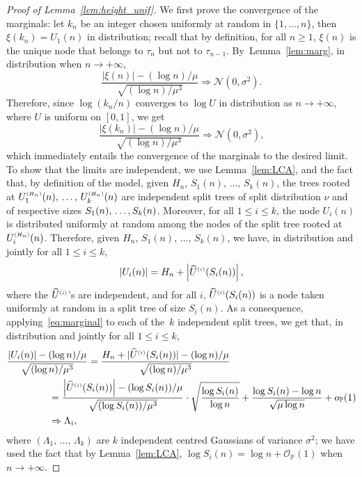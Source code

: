 \documentclass[10pt]{amsart}
\theoremstyle{definition}\newtheorem{defi}[theo]{Definition}\newtheorem{rema}[theo]{Remark}\newtheorem{exam}[theo]{Example}\newtheorem{exem}[theo]{Example}\newtheorem{nota}[theo]{Notation}
\newcommand{\sss}{\ensuremath{\scriptscriptstyle}}
\newcommand{\op}{{o_{\bbP}}}
\newcommand{\Op}{{\mathcal O_{\bbP}}}
\newcommand{\bbP}{\mathbb{P}}
\newcommand{\clN}{\mathcal{N}}
\begin{document}
\begin{proof}[Proof of Lemma~\ref{lem:height_unif}]
We first prove the convergence of the marginals: let $k_n$ be an integer chosen uniformly at random in $\{1, \ldots, n\}$, then $\xi(k_n) = U_1(n)$ in distribution; recall that by definition, for all $n\geq 1$, $\xi(n)$ is the unique node that belongs to $\tau_n$ but not to $\tau_{n-1}$. By~Lemma~\ref{lem:marg}, in distribution when $n\to+\infty$,
\[
\frac{|\xi(n)|-(\log n)/\mu}{\sqrt{(\log n)/\mu^3}}\Rightarrow\clN(0,\sigma^2).
\]
Therefore, since $\log (k_n/n)$ converges to $\log U$ in distribution as $n\to+\infty$, where $U$ is uniform on $[0,1]$, we get
\begin{equation}\label{eq:marginal}
\frac{|\xi(k_n)|-(\log n)/\mu}{\sqrt{(\log n)/\mu^3}}\Rightarrow\clN(0,\sigma^2),
\end{equation}
which immediately entails the convergence of the marginals to the desired limit. To show that the limits are independent, we use Lemma~\ref{lem:LCA}, and the fact that, by definition of the model, given $H_n$, $S_1(n), \,\ldots,\,S_k(n)$, the trees rooted at $U_1^{\sss (H_n)}(n),\,\ldots,\,U_k^{\sss (H_n)}\linebreak(n)$ are independent split trees of split distribution $\nu$ and of respective sizes $S_1(n), \,\ldots,\linebreak S_k(n)$. Moreover, for all $1\leq i\leq k$, the node $U_i(n)$ is distributed uniformly at random among the nodes of the split tree rooted at $U_i^{\sss (H_n)}(n)$. Therefore, given $H_n$, $S_1(n), \,\ldots,\,S_k(n)$, we have, in distribution and jointly for all $1\leq i\leq k$,
\[
|U_i(n)| = H_n + \left|\widehat U^{\sss (i)}(S_i(n))\right|,
\]
where the $\widehat U^{\sss (i)}$'s are independent, and for all $i$, $\widehat U^{\sss (i)}(S_i(n))$ is a node taken uniformly at random in a split tree of size $S_i(n)$. As a consequence, applying~\eqref{eq:marginal} to each of the~$k$ independent split trees, we get that, in distribution and jointly for all $1\leq i\leq k$,
\begin{align*}
\frac{|U_i(n)|-(\log n)/\mu}{\sqrt{(\log n)/\mu^3}} &= \frac{H_n + |\widehat U^{\sss (i)}(S_i(n))|-(\log n)/\mu}{\sqrt{(\log n)/\mu^3}}\\
&\hskip-4em= \frac{\left|\widehat U^{\sss (i)}(S_i(n))\right|-(\log S_i(n))/\mu}{\sqrt{(\log S_i(n))/\mu^3}}
\cdot \sqrt{\frac{\log S_i(n)}{\log n}} + \frac{\log S_i(n)-\log n}{\sqrt{\mu\log n}} +\op(1)\\
&\hskip-4em\Rightarrow \Lambda_i,
\end{align*}
where $(\Lambda_1,\,\ldots,\, \Lambda_k)$ are $k$ independent centred Gaussians of variance $\sigma^2$; we have used the fact that by Lemma~\ref{lem:LCA}, $\log S_i(n) = \log n + \Op(1)$ when $n\to+\infty$.
\end{proof}
\end{document}
